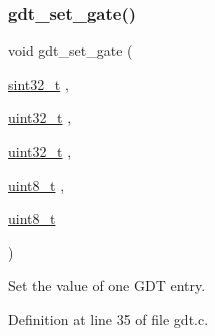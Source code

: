 \subsubsection{\texorpdfstring{gdt\+\_\+set\+\_\+gate()}{gdt\_set\_gate()}}
{\footnotesize\ttfamily void gdt\+\_\+set\+\_\+gate (\begin{DoxyParamCaption}\item[{\hyperlink{a00104_ad838970452fe561cb8e0550cac5336be_ad838970452fe561cb8e0550cac5336be}{sint32\+\_\+t}}]{,  }\item[{\hyperlink{a00104_a435d1572bf3f880d55459d9805097f62_a435d1572bf3f880d55459d9805097f62}{uint32\+\_\+t}}]{,  }\item[{\hyperlink{a00104_a435d1572bf3f880d55459d9805097f62_a435d1572bf3f880d55459d9805097f62}{uint32\+\_\+t}}]{,  }\item[{\hyperlink{a00104_aba7bc1797add20fe3efdf37ced1182c5_aba7bc1797add20fe3efdf37ced1182c5}{uint8\+\_\+t}}]{,  }\item[{\hyperlink{a00104_aba7bc1797add20fe3efdf37ced1182c5_aba7bc1797add20fe3efdf37ced1182c5}{uint8\+\_\+t}}]{ }\end{DoxyParamCaption})}



Set the value of one G\+DT entry. 



Definition at line 35 of file gdt.\+c.


